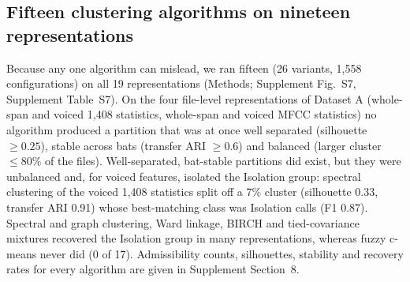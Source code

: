 \subsection{Fifteen clustering algorithms on nineteen representations}\label{sec:allm}
Because any one algorithm can mislead, we ran fifteen (26 variants, 1,558 configurations) on all 19 representations (Methods; Supplement Fig.~S7, Supplement Table~S7). On the four file-level representations of Dataset A (whole-span and voiced 1,408 statistics, whole-span and voiced MFCC statistics) no algorithm produced a partition that was at once well separated (silhouette $\ge0.25$), stable across bats (transfer ARI $\ge0.6$) and balanced (larger cluster $\le80\%$ of the files). Well-separated, bat-stable partitions did exist, but they were unbalanced and, for voiced features, isolated the Isolation group: spectral clustering of the voiced 1,408 statistics split off a 7\% cluster (silhouette 0.33, transfer ARI 0.91) whose best-matching class was Isolation calls (F1 0.87). Spectral and graph clustering, Ward linkage, BIRCH and tied-covariance mixtures recovered the Isolation group in many representations, whereas fuzzy c-means never did (0 of 17). Admissibility counts, silhouettes, stability and recovery rates for every algorithm are given in Supplement Section~8.


